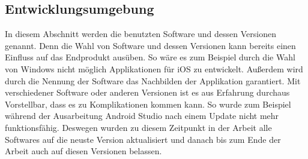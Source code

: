 \subsection{Entwicklungsumgebung}\label{subsection:entwicklungsumgebung}\myCheckmark%
In diesem Abschnitt werden die benutzten Software und dessen Versionen genannt. %
Denn die Wahl von Software und dessen Versionen kann bereits einen Einfluss auf das Endprodukt ausüben. So wäre es zum Beispiel durch die Wahl von Windows nicht möglich Applikationen für iOS zu entwickelt.\newline%
	Außerdem wird durch die Nennung der Software das Nachbilden der Applikation garantiert. Mit verschiedener Software oder anderen Versionen ist es aus Erfahrung durchaus Vorstellbar, dass es zu Komplikationen kommen kann. So wurde zum Beispiel während der Ausarbeitung Android Studio nach einem Update nicht mehr funktionsfähig. %
		Deswegen wurden zu diesem Zeitpunkt in der Arbeit alle Softwares auf die neuste Version aktualisiert und danach bis zum Ende der Arbeit auch auf diesen Versionen belassen. %

